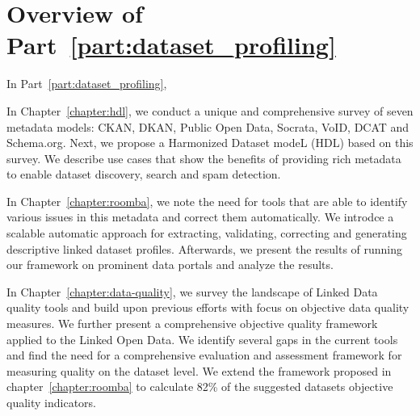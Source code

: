 \chapter*{Overview of Part~\ref{part:dataset_profiling}}

In Part~\ref{part:dataset_profiling},

In Chapter~\ref{chapter:hdl}, we conduct a unique and comprehensive survey of seven metadata models: CKAN, DKAN, Public Open Data, Socrata, VoID, DCAT and Schema.org. Next, we propose a Harmonized Dataset modeL (HDL) based on this survey. We describe use cases that show the benefits of providing rich metadata to enable dataset discovery, search and spam detection.

In Chapter~\ref{chapter:roomba}, we note the need for tools that are able to identify various issues in this metadata and correct them automatically. We introdce a scalable automatic approach for extracting, validating, correcting and generating descriptive linked dataset profiles. Afterwards, we present the results of running our framework on prominent data portals and analyze the results.

In Chapter~\ref{chapter:data-quality}, we survey the landscape of Linked Data quality tools and build upon previous efforts with focus on objective data quality measures. We further present a comprehensive objective quality framework applied to the Linked Open Data. We identify several gaps in the current tools and find the need for a comprehensive evaluation and assessment framework for measuring quality on the dataset level. We extend the framework proposed in chapter~\ref{chapter:roomba} to calculate 82\% of the suggested datasets objective quality indicators.